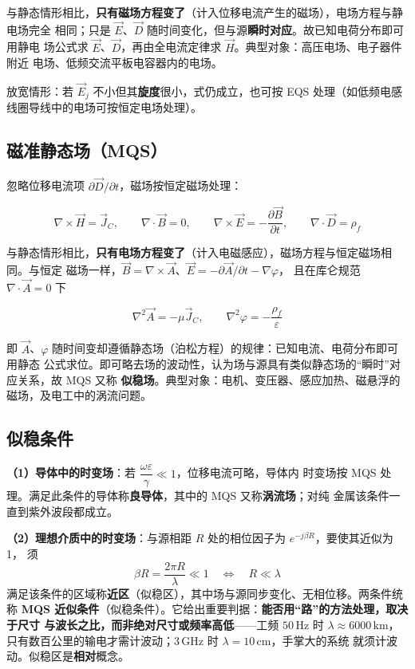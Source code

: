 与静态情形相比，\textbf{只有磁场方程变了}（计入位移电流产生的磁场），电场方程与静电场完全
相同；只是 $\vec{E}$、$\vec{D}$ 随时间变化，但与源\textbf{瞬时对应}。故已知电荷分布即可用静电
场公式求 $\vec{E}$、$\vec{D}$，再由全电流定律求 $\vec{H}$。典型对象：高压电场、电子器件附近
电场、低频交流平板电容器内的电场。

放宽情形：若 $\vec{E}_j$ 不小但其\textbf{旋度}很小，式仍成立，也可按 EQS 处理（如低频电感
线圈导线中的电场可按恒定电场处理）。

\subsection{磁准静态场（MQS）}

忽略位移电流项 $\partial\vec{D}/\partial t$，磁场按恒定磁场处理：

\begin{formulaBox}
\[
\nabla\times\vec{H}=\vec{J}_C,
\qquad
\nabla\cdot\vec{B}=0,
\qquad
\nabla\times\vec{E}=-\frac{\partial\vec{B}}{\partial t},
\qquad
\nabla\cdot\vec{D}=\rho_f
\]
\end{formulaBox}

与静态情形相比，\textbf{只有电场方程变了}（计入电磁感应），磁场方程与恒定磁场相同。与恒定
磁场一样，$\vec{B}=\nabla\times\vec{A}$、$\vec{E}=-\partial\vec{A}/\partial t-\nabla\varphi$，
且在库仑规范 $\nabla\cdot\vec{A}=0$ 下

\begin{formulaBox}
\[
\nabla^{2}\vec{A}=-\mu\vec{J}_C,
\qquad
\nabla^{2}\varphi=-\frac{\rho_f}{\varepsilon}
\]
\end{formulaBox}

即 $\vec{A}$、$\varphi$ 随时间变却遵循静态场（泊松方程）的规律：已知电流、电荷分布即可用静态
公式求位。即可略去场的波动性，认为场与源具有类似静态场的“瞬时”对应关系，故 MQS 又称
\textbf{似稳场}。典型对象：电机、变压器、感应加热、磁悬浮的磁场，及电工中的涡流问题。

\subsection{似稳条件}

\textbf{（1）导体中的时变场}：若 $\dfrac{\omega\varepsilon}{\gamma}\ll1$，位移电流可略，导体内
时变场按 MQS 处理。满足此条件的导体称\textbf{良导体}，其中的 MQS 又称\textbf{涡流场}；对纯
金属该条件一直到紫外波段都成立。

\textbf{（2）理想介质中的时变场}：与源相距 $R$ 处的相位因子为 $e^{-j\beta R}$，要使其近似为 1，
须
\[
\beta R=\frac{2\pi R}{\lambda}\ll1
\quad\Longleftrightarrow\quad
R\ll\lambda
\]
满足该条件的区域称\textbf{近区}（似稳区），其中场与源同步变化、无相位移。两条件统称
\textbf{MQS 近似条件}（似稳条件）。它给出重要判据：\textbf{能否用“路”的方法处理，取决于尺寸
与波长之比，而非绝对尺寸或频率高低}——工频 $50\,\mathrm{Hz}$ 时 $\lambda\approx6000\,\mathrm{km}$，
只有数百公里的输电才需计波动；$3\,\mathrm{GHz}$ 时 $\lambda=10\,\mathrm{cm}$，手掌大的系统
就须计波动。似稳区是\textbf{相对}概念。

